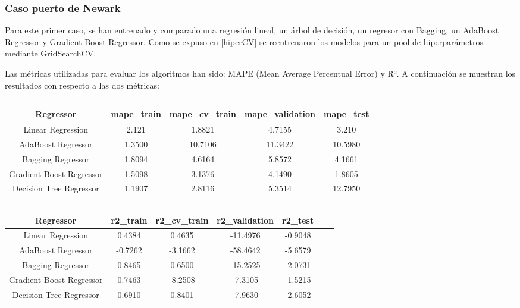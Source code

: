 \documentclass[12pt]{article}
\begin{document}
	\subsubsection{\label{evalNewark} Caso puerto de Newark}
	Para este primer caso, se han entrenado y comparado una regresión lineal, un árbol de decisión, un regresor con Bagging, un AdaBoost Regressor y Gradient Boost Regressor. Como se expuso en \ref{hiperCV} se reentrenaron los modelos para un pool de hiperparámetros mediante GridSearchCV.
	
	Las métricas utilizadas para evaluar los algoritmos han sido: MAPE (Mean Average Percentual Error) y R². A continuación se muestran los resultados con respecto a las dos métricas:
	
	\begingroup
	\begin{table}[H]
	\caption{\label{tabla}}
		\centering
		\setlength{\tabcolsep}{3pt}
		\renewcommand{\arraystretch}{1.5}
		\begin{tabular}{|c|c|c|c|c|c|c|}
			\hline
			Regressor & mape\_train & mape\_cv\_train & mape\_validation & mape\_test \\
			\hline
			Linear Regression & 2.121 & 1.8821 & 4.7155 & 3.210 \\
			AdaBoost Regressor & 1.3500 & 10.7106 & 11.3422 & 10.5980 \\
			Bagging Regressor & 1.8094 & 4.6164 & 5.8572 & 4.1661 \\
			Gradient Boost Regressor & 1.5098 & 3.1376 & 4.1490 & 1.8605 \\
			Decision Tree Regressor & 1.1907 & 2.8116 & 5.3514 & 12.7950 \\
			\hline
		\end{tabular}
	\end{table}
	\endgroup
	
	\begingroup
	\begin{table}[H]
		\caption{\label{tabla}}
		\centering
		\setlength{\tabcolsep}{3pt}
		\renewcommand{\arraystretch}{1.5}
		\begin{tabular}{|c|c|c|c|c|c|c|}
			\hline
			Regressor & r2\_train & r2\_cv\_train & r2\_validation & r2\_test \\
			\hline
			Linear Regression & 0.4384 & 0.4635 & -11.4976 & -0.9048 \\
			AdaBoost Regressor & -0.7262 & -3.1662 & -58.4642 & -5.6579 \\
			Bagging Regressor & 0.8465 & 0.6500 & -15.2525 & -2.0731 \\
			Gradient Boost Regressor & 0.7463 & -8.2508 & -7.3105 & -1.5215 \\
			Decision Tree Regressor & 0.6910 & 0.8401 & -7.9630 & -2.6052 \\
			\hline
		\end{tabular}
	\end{table}
	\endgroup
	
\end{document}
